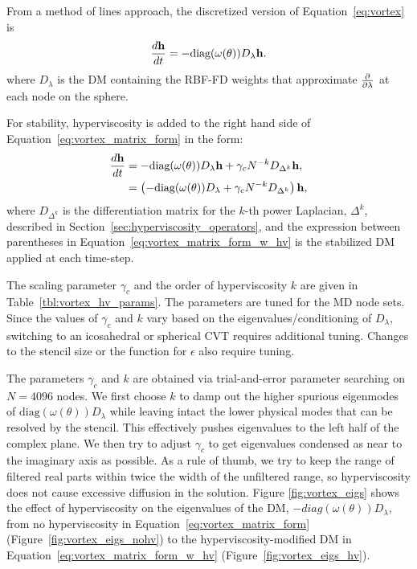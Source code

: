 \documentclass{report}
\begin{document}
From a method of lines approach, the discretized version of Equation~\ref{eq:vortex} is
\begin{equation}
\frac{d \mathbf{h}}{d t} = - \text{diag}(\omega(\theta)) D_\lambda \mathbf{h}.
\label{eq:vortex_matrix_form}
\end{equation}
where $D_\lambda$ is the DM containing the RBF-FD weights that approximate $\frac{\partial }{\partial \lambda}$ at each node on the sphere.

For stability, hyperviscosity is added to the right hand side of Equation~\ref{eq:vortex_matrix_form} in the form: 
\begin{align}
\frac{d \mathbf{h}}{d t} & = - \text{diag}(\omega(\theta)) D_\lambda \mathbf{h} + \gamma_c N^{-k} D_{\Delta^{k}} \mathbf{h}, \nonumber \\
 & = \left(- \text{diag}(\omega(\theta)) D_\lambda + \gamma_c N^{-k} D_{\Delta^{k}}\right) \mathbf{h}, 
\label{eq:vortex_matrix_form_w_hv}
\end{align}
where $D_{\Delta^{k}}$ is the differentiation matrix for the $k$-th power Laplacian, $\Delta^{k}$, described in Section~\ref{sec:hyperviscosity_operators}, and the expression between parentheses in Equation~\ref{eq:vortex_matrix_form_w_hv} is the stabilized DM applied at each time-step. 

The scaling parameter $\gamma_c$ and the order of hyperviscosity $k$ are given in
Table~\ref{tbl:vortex_hv_params}. The parameters are tuned for the MD node sets. Since the values of $\gamma_c$ and $k$ vary based on the eigenvalues/conditioning of $D_\lambda$, switching to an icosahedral or spherical CVT requires additional tuning. Changes to the stencil size or the function for $\epsilon$ also require tuning. 

The parameters $\gamma_c$ and $k$ are obtained via trial-and-error parameter searching on $N=4096$ nodes. 
We first choose $k$ to damp out the higher spurious eigenmodes of $\text{diag}(\omega(\theta)) D_\lambda$ while leaving intact the lower physical modes that can be resolved by the stencil. This effectively pushes eigenvalues to the left half of the complex plane.  We then try to adjust $\gamma_c$ to get eigenvalues condensed as near to the imaginary axis as possible. As a rule of thumb, we try to keep the range of filtered real parts within twice the width of the unfiltered range, so hyperviscosity does not cause excessive diffusion in the solution. Figure \ref{fig:vortex_eigs} shows the effect of hyperviscosity on the eigenvalues of the DM, $-diag(\omega(\theta)) D_\lambda$, from no hyperviscosity in Equation~\ref{eq:vortex_matrix_form} (Figure~\ref{fig:vortex_eigs_nohv}) to the hyperviscosity-modified DM in Equation~\ref{eq:vortex_matrix_form_w_hv} (Figure~\ref{fig:vortex_eigs_hv}). 
\end{document}
